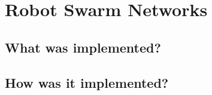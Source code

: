 \chapter{Robot Swarm Networks}
\label{chapter5}

    

\section{What was implemented?}



\section{How was it implemented?}
    


